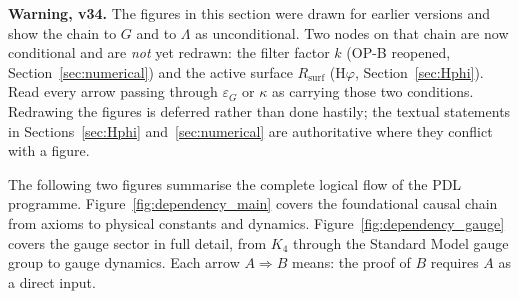 \documentclass[11pt,a4paper]{article}
\theoremstyle{plain}
\theoremstyle{definition}
\theoremstyle{remark}
\newcommand{\Rsurf}{R_{\mathrm{surf}}}
\begin{document}
\noindent\textcolor{negativered}{\textbf{Warning, v34.} The figures in this section were drawn for earlier versions and show the chain to $G$ and to $\Lambda$ as unconditional. Two nodes on that chain are now conditional and are \emph{not} yet redrawn: the filter factor $k$ (\textcolor{openproblemred}{OP-B reopened}, Section~\ref{sec:numerical}) and the active surface $\Rsurf$ (\textcolor{hypothesisorange}{H$\varphi$}, Section~\ref{sec:Hphi}). Read every arrow passing through $\varepsilon_G$ or $\kappa$ as carrying those two conditions. Redrawing the figures is deferred rather than done hastily; the textual statements in Sections~\ref{sec:Hphi} and~\ref{sec:numerical} are authoritative where they conflict with a figure.}
\label{sec:dependency}

The following two figures summarise the complete logical flow of the PDL programme. Figure~\ref{fig:dependency_main} covers the foundational causal chain from axioms to physical constants and dynamics. Figure~\ref{fig:dependency_gauge} covers the gauge sector in full detail, from $K_4$ through the Standard Model gauge group to gauge dynamics. Each arrow $A\Rightarrow B$ means: the proof of $B$ requires $A$ as a direct input.
\end{document}
